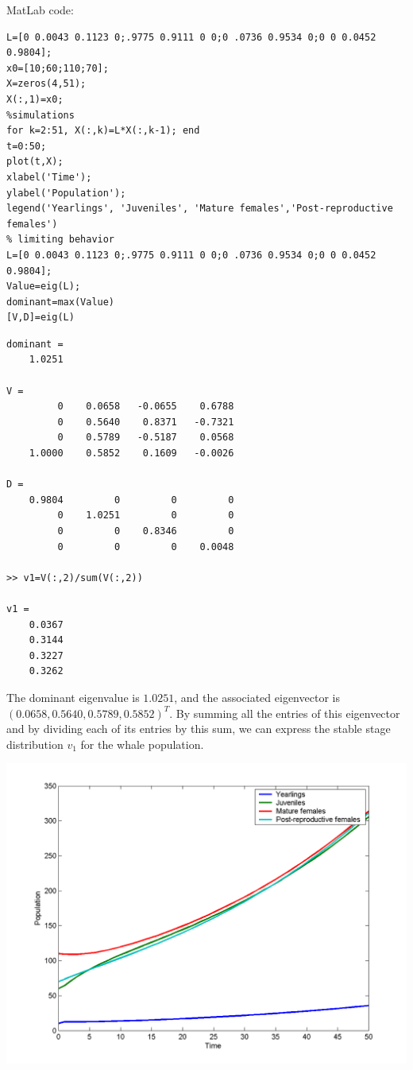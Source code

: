 MatLab code:
\begin{verbatim}
L=[0 0.0043 0.1123 0;.9775 0.9111 0 0;0 .0736 0.9534 0;0 0 0.0452 0.9804];
x0=[10;60;110;70];
X=zeros(4,51);
X(:,1)=x0;
%simulations
for k=2:51, X(:,k)=L*X(:,k-1); end
t=0:50;
plot(t,X);
xlabel('Time');
ylabel('Population');
legend('Yearlings', 'Juveniles', 'Mature females','Post-reproductive females')
% limiting behavior
L=[0 0.0043 0.1123 0;.9775 0.9111 0 0;0 .0736 0.9534 0;0 0 0.0452 0.9804];
Value=eig(L);
dominant=max(Value)
[V,D]=eig(L)
\end{verbatim}

\begin{verbatim}
dominant =
    1.0251

V =
         0    0.0658   -0.0655    0.6788
         0    0.5640    0.8371   -0.7321
         0    0.5789   -0.5187    0.0568
    1.0000    0.5852    0.1609   -0.0026

D =
    0.9804         0         0         0
         0    1.0251         0         0
         0         0    0.8346         0
         0         0         0    0.0048

>> v1=V(:,2)/sum(V(:,2))

v1 =
    0.0367
    0.3144
    0.3227
    0.3262
\end{verbatim}

The dominant eigenvalue is $1.0251$, and the associated eigenvector is $(0.0658,0.5640,0.5789,0.5852)^T$. By summing all the entries of this eigenvector and by dividing each of its entries by this sum, we can express the stable stage distribution $v_1$ for the whale population.

\begin{center}
\includegraphics[width=.6\textwidth]{figs_steph/KillerWhales}
\end{center}














